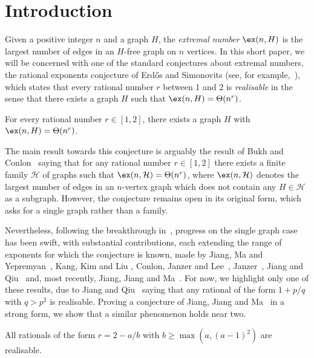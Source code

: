 \section{Introduction}



Given a positive integer $n$ and a graph $H$, the {\it extremal number} $\ex(n,H)$ is the largest number of edges in an $H$-free graph on $n$ vertices. In this short paper, we will be concerned with one of the standard conjectures about extremal numbers, the rational exponents conjecture of Erd\H{o}s and Simonovits (see, for example,~\cite{E81}), which states that every rational number $r$ between 1 and 2 is {\it realisable} in the sense that there exists a graph $H$ such that $\ex(n,H)=\Theta(n^r)$.

\begin{conjecture} \label{con:rational}
	For every rational number $r\in [1,2]$, there exists a graph $H$ with $\ex(n,H)=\Theta(n^r)$.
\end{conjecture}

The main result towards this conjecture is arguably the result of Bukh and Conlon~\cite{BC18} saying that for any rational number $r\in [1,2]$ there exists a finite family $\mathcal{H}$ of graphs such that $\ex(n,\mathcal{H})=\Theta(n^r)$, where $\ex(n,\mathcal{H})$ denotes the largest number of edges in an $n$-vertex graph which does not contain any $H\in \mathcal{H}$ as a subgraph. However, the conjecture remains open in its original form, which asks for a single graph rather than a family.

Nevertheless, following the breakthrough in~\cite{BC18}, progress on the single graph case has been swift, with substantial contributions, each extending the range of exponents for which the conjecture is known, made by Jiang, Ma and Yepremyan~\cite{JMY18}, Kang, Kim and Liu \cite{KKL18}, Conlon, Janzer and Lee~\cite{CJL21}, Janzer~\cite{Jan20}, Jiang and Qiu~\cite{JQ20,JQ19} and, most recently, Jiang, Jiang and Ma~\cite{JJM20}. For now, we highlight only one of these results, due to Jiang and Qiu~\cite{JQ19} saying that any rational of the form $1 + p/q$ with $q > p^2$ is realisable. 
Proving a conjecture of Jiang, Jiang and Ma~\cite[Conjecture 11]{JJM20} in a strong form, we show that a similar phenomenon holds near two.

\begin{theorem} \label{thm:main}
All rationals of the form $r = 2 - a/b$ with $b \geq \max(a, (a-1)^2)$ are realisable.
\end{theorem}

